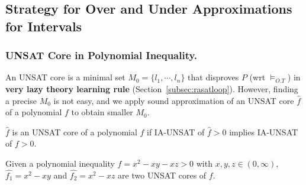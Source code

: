 \documentclass[runningheads,a4paper,oribibl]{llncs}
\newcommand{\suppress}[1]{} %
\begin{document}
\subsection{Strategy for Over and Under Approximations for Intervals} 

\subsubsection{UNSAT Core in Polynomial Inequality.} 
\suppress{
\begin{itemize}
\item{\textbf{Very lazy theory learning rule with UNSAT cores} is applied for learning only minimal sets when $M \models_{O.T} \neg P$.}
\[
M \mathrel{\lVert} I \wedge P 
\Longrightarrow_{\textit{VL}}
\emptyset \mathrel{\lVert}  I 
\wedge (\neg l_1 \vee \cdots \vee \neg l_n ) \wedge P
\quad\textit{if}\quad
\begin{cases}
\text{$M_0=\{l_1,\ldots,l_n \} \subseteq M$,} \\
\text{$M_0$ is a minimal set and} \\
\text{$l_1 \wedge \cdots \wedge l_n \models_{O.T} \neg P$.}
\end{cases}
\]
$M_0=\{l_1,\ldots,l_n \}$ is a minimal set if and only if not existing a sub set $\{l_1,\ldots,l_k \}$ of $M_0$ such that \text{$l_1 \wedge \cdots \wedge l_k \models_{O.T} \neg P$.} 
\end{itemize}
}
An UNSAT core is a minimal set $M_0 = \{ l_1, \cdots, l_n \}$ that disproves $P$ (wrt $\models_{O.T}$) 
in {\bf very lazy theory learning rule} (Section~\ref{subsec:rasatloop}). 
However, finding a precise $M_0$ is not easy, and 
we apply sound approximation of an UNSAT core $\hat{f}$ of a polynomial $f$ to obtain smaller $M_0$. 


\begin{definition} \label{def:unsatcore}
$\hat{f}$ is an UNSAT core of a polynomial $f$ if IA-UNSAT of  
$\hat{f} > 0$ implies IA-UNSAT of $f > 0$. 
\end{definition}

\begin{example} \label{examp: unsatcore}
Given a polynomial inequality $f=x^2 - xy - xz > 0$ with $x, y, z \in (0, \infty)$, 
$\hat{f_1} = x^2 - xy$ and $\hat{f_2} = x^2 - xz$ are two UNSAT cores of $f$.
\end{example}
\suppress{
For instance, $\hat{f_1} > 0$ is IA-UNSAT under $x \in (1,2) \wedge y \in (4,5)$, 
then $f > 0$ is IA-UNSAT under a set of input boxes 
$\{x\in (1,2) \wedge y \in (4,5) \wedge z \in (0,1), 
 x \in (1,2) \wedge y \in (4,5) \wedge z \in (1,2), \cdots \}$, 
which is a set of all input boxes including $x \in (1,2) \wedge y \in (4,5)$. 
For removing unsatisfiable input boxes, $\neg (x \in (1,2)) \vee \neg (y \in (4,5))$ 
is added to interval constraints $I$ as a learnt clause.
}
\end{document}
